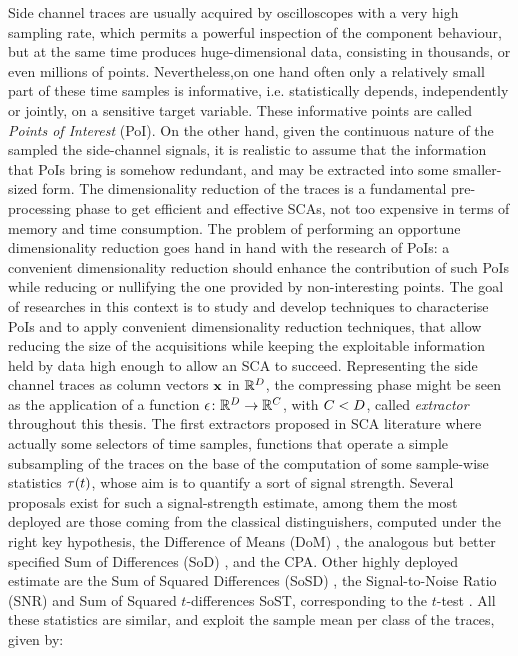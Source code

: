 Side channel traces are usually acquired by oscilloscopes with a very high sampling rate, which permits a powerful inspection of the component behaviour, but at the same time produces huge-dimensional data, consisting in thousands, or even millions of points. Nevertheless,on one hand often only a relatively small part of these time samples is informative, i.e. statistically depends, independently or jointly, on a sensitive target variable. These informative points are called \emph{Points of Interest} (PoI). On the other hand, given the continuous nature of the sampled the side-channel signals, it is realistic to assume that the information that PoIs bring is somehow redundant, and may be extracted into some smaller-sized form. The dimensionality reduction of the traces is a fundamental pre-processing phase to get efficient and effective SCAs, not too expensive in terms of memory and time consumption. The problem of performing an opportune dimensionality reduction goes hand in hand with the research of PoIs: a convenient dimensionality reduction should enhance the contribution of such PoIs while reducing or nullifying the one provided by non-interesting points. 
The goal of researches in this context is to study and develop techniques to characterise PoIs and to apply convenient dimensionality reduction techniques, that allow reducing the size of the acquisitions while keeping the exploitable information held by data high enough to allow an SCA to succeed.
Representing the side channel traces as column vectors ${\bf x}$ in $\mathbb{R}^D$, the compressing phase might be seen as the application of a function $\epsilon\colon \mathbb{R}^D\rightarrow \mathbb{R}^C$, with $C<D$, called {\em extractor} throughout this thesis. The first extractors proposed in SCA literature where actually some selectors of time samples, \ie functions that operate a simple subsampling of the traces on the base of the computation of some sample-wise statistics $\tau(t)$, whose aim is to quantify a sort of  signal strength. Several proposals exist for such a signal-strength estimate, among them the most deployed are those coming from the classical distinguishers, computed under the right key hypothesis, \eg the Difference of Means (DoM) \cite{Chari2003}, the analogous but better specified Sum of Differences (SoD) \cite{Rechberger2005}, and the CPA. Other highly deployed estimate are the Sum of Squared Differences (SoSD) \cite{gierlichs2006templates}, the Signal-to-Noise Ratio (SNR) \cite{mangard2008power,lomne2013behind} and  Sum of Squared $t$-differences SoST, corresponding to the $t$-test \cite{gierlichs2006templates}. All these statistics are similar, and exploit the sample mean per class of the traces, given by:
